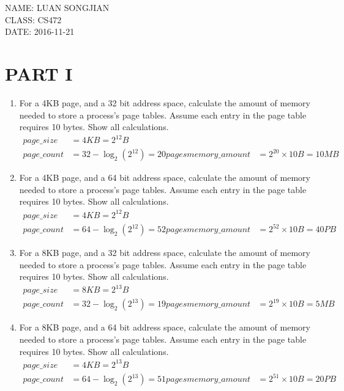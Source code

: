 \documentclass[letterpaper, onecolumn, 10pt]{IEEEtran}
\def\name{LUAN SONGJIAN}
\def\class{CS472}
\begin{document}
\noindent NAME: \name \\
\noindent CLASS: \class \\
\noindent DATE: 2016-11-21 \\

\section*{PART I}
\begin{enumerate}
\item For a 4KB page, and a 32 bit address space, calculate the amount of memory needed to store a process's page tables. Assume each entry in the page table requires 10 bytes. Show all calculations.
\begin{align}
page\_size & = 4KB = 2^{12}B \\
page\_count & = 32 - \log_2 (2^{12}) = 20pages
memory\_amount & = 2^{20}\times10B = 10MB
\end{align}

\item For a 4KB page, and a 64 bit address space, calculate the amount of memory needed to store a process's page tables. Assume each entry in the page table requires 10 bytes. Show all calculations.
\begin{align}
page\_size & = 4KB = 2^{12}B \\
page\_count & = 64 - \log_2 (2^{12}) = 52pages
memory\_amount & = 2^{52}\times10B = 40PB
\end{align}

\item For a 8KB page, and a 32 bit address space, calculate the amount of memory needed to store a process's page tables. Assume each entry in the page table requires 10 bytes. Show all calculations.
\begin{align}
page\_size & = 8KB = 2^{13}B \\
page\_count & = 32 - \log_2 (2^{13}) = 19pages
memory\_amount & = 2^{19}\times10B = 5MB
\end{align}

\item For a 8KB page, and a 64 bit address space, calculate the amount of memory needed to store a process's page tables. Assume each entry in the page table requires 10 bytes. Show all calculations.
\begin{align}
page\_size & = 4KB = 2^{13}B \\
page\_count & = 64 - \log_2 (2^{13}) = 51pages
memory\_amount & = 2^{51}\times10B = 20PB
\end{align}


\end{enumerate}
\end{document}
